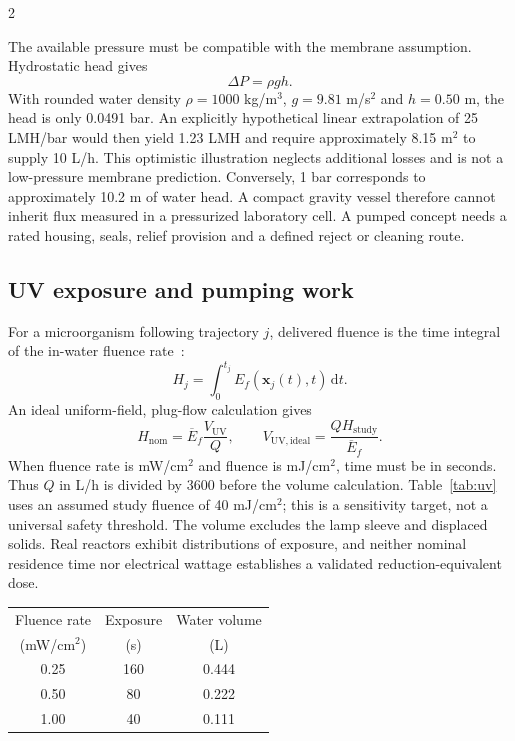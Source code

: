 \documentclass{ieeeaccess}
\makeatletter
\newenvironment{inlinetable}{\par\addvspace{6pt plus 10pt minus 2pt}\noindent\begin{minipage}{\linewidth}\def\@captype{table}\centering}{\end{minipage}\par\addvspace{7pt plus 10pt minus 2pt}}
\makeatother
\begin{document}
\begin{multicols}{2}

The available pressure must be compatible with the membrane assumption. Hydrostatic head gives
\begin{equation}
\Delta P=\rho g h.
\label{eq:head}
\end{equation}
With rounded water density $\rho=1000$ kg/m$^3$, $g=9.81$ m/s$^2$ and $h=0.50$ m, the head is only 0.0491 bar. An explicitly hypothetical linear extrapolation of 25 LMH/bar would then yield 1.23 LMH and require approximately 8.15 m$^2$ to supply 10 L/h. This optimistic illustration neglects additional losses and is not a low-pressure membrane prediction. Conversely, 1 bar corresponds to approximately 10.2 m of water head. A compact gravity vessel therefore cannot inherit flux measured in a pressurized laboratory cell. A pumped concept needs a rated housing, seals, relief provision and a defined reject or cleaning route.

\subsection{UV exposure and pumping work}
For a microorganism following trajectory $j$, delivered fluence is the time integral of the in-water fluence rate~\cite{epa_uv2006}:
\begin{equation}
H_j=\int_0^{t_j} E_f(\mathbf{x}_j(t),t)\,\mathrm{d}t.
\label{eq:uvpath}
\end{equation}
An ideal uniform-field, plug-flow calculation gives
\begin{equation}
H_{\mathrm{nom}}=\overline{E}_f\frac{V_{\mathrm{UV}}}{Q},\qquad
V_{\mathrm{UV,ideal}}=\frac{Q H_{\mathrm{study}}}{\overline{E}_f}.
\label{eq:uvvolume}
\end{equation}
When fluence rate is mW/cm$^2$ and fluence is mJ/cm$^2$, time must be in seconds. Thus $Q$ in L/h is divided by 3600 before the volume calculation. Table~\ref{tab:uv} uses an assumed study fluence of 40 mJ/cm$^2$; this is a sensitivity target, not a universal safety threshold. The volume excludes the lamp sleeve and displaced solids. Real reactors exhibit distributions of exposure, and neither nominal residence time nor electrical wattage establishes a validated reduction-equivalent dose.

\begin{inlinetable}
\caption{Ideal UV sizing at assumed flow 10 L/h and study fluence 40 mJ/cm$^2$. Optical inputs are independent assumptions.}
\label{tab:uv}
\centering\small
\begin{tabular}{ccc}
\toprule
Fluence rate & Exposure & Water volume\\
(mW/cm$^2$) & (s) & (L)\\
\midrule
0.25 & 160 & 0.444\\
0.50 & 80 & 0.222\\
1.00 & 40 & 0.111\\
\bottomrule
\end{tabular}
\end{inlinetable}


\end{multicols}
\end{document}
